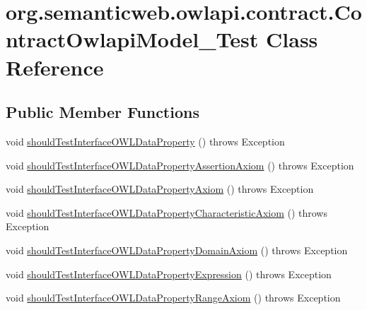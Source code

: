 \hypertarget{classorg_1_1semanticweb_1_1owlapi_1_1contract_1_1_contract_owlapi_model__2_test}{\section{org.\-semanticweb.\-owlapi.\-contract.\-Contract\-Owlapi\-Model\-\_\-Test Class Reference}
\label{classorg_1_1semanticweb_1_1owlapi_1_1contract_1_1_contract_owlapi_model__2_test}
}
\subsection*{Public Member Functions}
\begin{DoxyCompactItemize}
\item 
void \hyperlink{classorg_1_1semanticweb_1_1owlapi_1_1contract_1_1_contract_owlapi_model__2_test_ab02b5eac5ca9d1b6be0166aee532b43e}{should\-Test\-Interface\-O\-W\-L\-Data\-Property} ()  throws Exception 
\item 
void \hyperlink{classorg_1_1semanticweb_1_1owlapi_1_1contract_1_1_contract_owlapi_model__2_test_adb8e2805845c75bb4610f4fa2a91c257}{should\-Test\-Interface\-O\-W\-L\-Data\-Property\-Assertion\-Axiom} ()  throws Exception 
\item 
void \hyperlink{classorg_1_1semanticweb_1_1owlapi_1_1contract_1_1_contract_owlapi_model__2_test_aeb5549ca8b4911be93ccb24f1e002610}{should\-Test\-Interface\-O\-W\-L\-Data\-Property\-Axiom} ()  throws Exception 
\item 
void \hyperlink{classorg_1_1semanticweb_1_1owlapi_1_1contract_1_1_contract_owlapi_model__2_test_a85e957ec3db867ca090ed4343424f8bc}{should\-Test\-Interface\-O\-W\-L\-Data\-Property\-Characteristic\-Axiom} ()  throws Exception 
\item 
void \hyperlink{classorg_1_1semanticweb_1_1owlapi_1_1contract_1_1_contract_owlapi_model__2_test_a8ed1d5cb4039f0bcf5153e69a5c2eda8}{should\-Test\-Interface\-O\-W\-L\-Data\-Property\-Domain\-Axiom} ()  throws Exception 
\item 
void \hyperlink{classorg_1_1semanticweb_1_1owlapi_1_1contract_1_1_contract_owlapi_model__2_test_aeeace611265a8f9b5e7d1403fa656dd1}{should\-Test\-Interface\-O\-W\-L\-Data\-Property\-Expression} ()  throws Exception 
\item 
void \hyperlink{classorg_1_1semanticweb_1_1owlapi_1_1contract_1_1_contract_owlapi_model__2_test_a5d906c446b3019ebad6c49887cf44698}{should\-Test\-Interface\-O\-W\-L\-Data\-Property\-Range\-Axiom} ()  throws Exception 

\end{DoxyCompactItemize}
